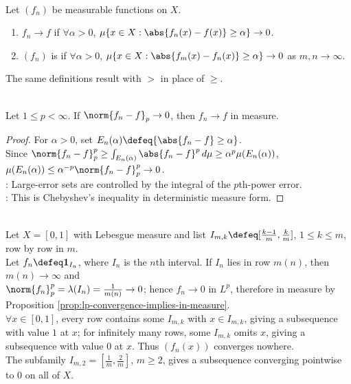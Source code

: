\begin{definition} \label{def:convergence-in-measure-and-cauchy} \\
Let $(f_n)$ be measurable functions on $X$.
\begin{enumerate}[label=(\roman*)]
\setlength{\itemsep}{0pt}
\item $f_n\to f$  if $\forall\alpha>0$, $\mu\{x\in X:\abs{f_n(x)-f(x)}\geq\alpha\}\to0$.
\item $(f_n)$ is  if $\forall\alpha>0$, $\mu\{x\in X:\abs{f_m(x)-f_n(x)}\geq\alpha\}\to0$ as $m,n\to\infty$.
\end{enumerate}
The same definitions result with $>$ in place of $\geq$.
\end{definition}

\begin{proposition} \label{prop:lp-convergence-implies-in-measure} \\
Let $1\leq p<\infty$. If $\norm{f_n-f}_p\to0$, then $f_n\to f$ in measure.
\begin{proof}
For $\alpha>0$, set $E_n(\alpha)\defeq\{\abs{f_n-f}\geq\alpha\}$.\\
Since $\norm{f_n-f}_p^p\geq\int_{E_n(\alpha)}\abs{f_n-f}^p\,d\mu\geq\alpha^p\mu(E_n(\alpha))$, $\mu(E_n(\alpha))\leq\alpha^{-p}\norm{f_n-f}_p^p\to0$.\\
: Large-error sets are controlled by the integral of the $p$th-power error.\\
: This is Chebyshev's inequality in deterministic measure form.
\end{proof}
\end{proposition}

\begin{example} \label{ex:typewriter-lp-no-pointwise} \\
Let $X=[0,1]$ with Lebesgue measure and list $I_{m,k}\defeq[\frac{k-1}{m},\frac{k}{m}]$, $1\leq k\leq m$, row by row in $m$.\\
Let $f_n\defeq\mathbf{1}_{I_n}$, where $I_n$ is the $n$th interval. If $I_n$ lies in row $m(n)$, then $m(n)\to\infty$ and\\
$\norm{f_n}_p^p=\lambda(I_n)=\frac{1}{m(n)}\to0$; hence $f_n\to0$ in $L^p$, therefore in measure by Proposition \ref{prop:lp-convergence-implies-in-measure}.\\
$\forall x\in[0,1]$, every row contains some $I_{m,k}$ with $x\in I_{m,k}$, giving a subsequence with value $1$ at $x$; for infinitely many rows, some $I_{m,k}$ omits $x$, giving a subsequence with value $0$ at $x$. Thus $(f_n(x))$ converges nowhere.\\
The subfamily $I_{m,2}=[\frac{1}{m},\frac{2}{m}]$, $m\geq2$, gives a subsequence converging pointwise to $0$ on all of $X$.
\end{example}

